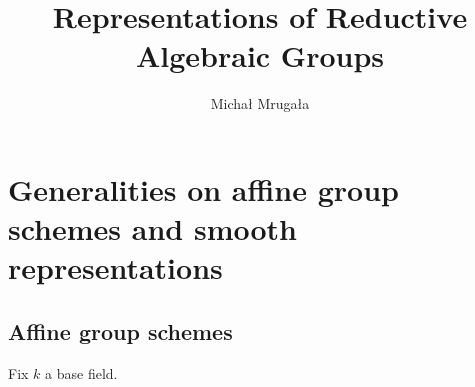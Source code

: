

\usepackage{stmaryrd}
\usepackage[nameinlink]{cleveref}

\newcommand{\SC}{\mathcal{C}}
\newcommand{\OO}{\mathcal{O}}
\def\coker{\operatorname{coker}}
\def\bL{\mathbf{L}}
\def\CT{\mathcal{T}}
\def\Aut{\operatorname{Aut}}
\def\wt{\widetilde}
\def\ko{\mathfrak{o}}
\def\kt{\mathfrak{t}}
\newcommand{\CX}{\mathcal{X}}
\def\coker{\operatorname{coker}}
\def\bL{\mathbf{L}}
\def\wh{\widehat}
\def\CI{\mathcal{I}}
\def\et{^\text{\'et}}
\def\sep{^\text{sep}}
\def\pr{\operatorname{pr}}
\def\img{\operatorname{im}}
\def\Sym{\operatorname{Sym}}
\def\CG{\mathcal{G}}
\def\N{\mathbb{N}}
\def\th{^{\mathrm{th}}}
\def\CN{\mathcal{N}}
\def\Inf{\operatorname{Inf}}
\def\rank{\operatorname{rank}}
\def\Pic{\operatorname{Pic}}
\def\i{\operatorname{inv}}
\def\Diag{\operatorname{Diag}}
\def\G{\mathbb{G}}
\def\End{\operatorname{End}}
\def\det{\operatorname{det}}
\def\SL{\bb{SL}}
\def\Rep{\operatorname{Rep}}
\def\Repf{\operatorname{Rep}^{\text{fd}}}
\def\Res{\operatorname{Res}}
\def\Ind{\operatorname{Ind}}
\def\CL{\mathcal{L}}

\title{Representations of Reductive Algebraic Groups}
\author{Micha{\l} Mruga{\l}a}

\maketitle

\section{Generalities on affine group schemes and smooth representations}
\subsection{Affine group schemes}
Fix $k$ a base field.


